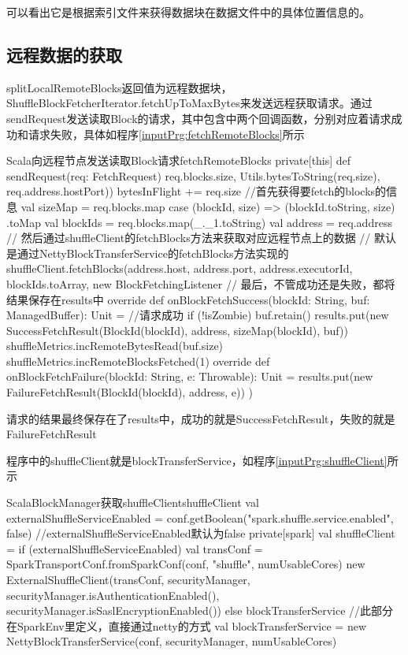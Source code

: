 可以看出它是根据索引文件来获得数据块在数据文件中的具体位置信息的。
\subsection{远程数据的获取}
splitLocalRemoteBlocks返回值为远程数据块，ShuffleBlockFetcherIterator.fetchUpToMaxBytes来发送远程获取请求。通过sendRequest发送读取Block的请求，其中包含中两个回调函数，分别对应着请求成功和请求失败，具体如程序\ref{inputPrg:fetchRemoteBlocks}所示
\begin{codeInput}{Scala}{向远程节点发送读取Block请求}{fetchRemoteBlocks}
private[this] def sendRequest(req: FetchRequest) {
  req.blocks.size, Utils.bytesToString(req.size), req.address.hostPort))
  bytesInFlight += req.size
  //首先获得要fetch的blocks的信息
  val sizeMap = req.blocks.map { case (blockId, size) => (blockId.toString, size) }.toMap
  val blockIds = req.blocks.map(_._1.toString)	
  val address = req.address
  // 然后通过shuffleClient的fetchBlocks方法来获取对应远程节点上的数据
  // 默认是通过NettyBlockTransferService的fetchBlocks方法实现的
  shuffleClient.fetchBlocks(address.host, address.port, address.executorId, blockIds.toArray,
    new BlockFetchingListener {
      // 最后，不管成功还是失败，都将结果保存在results中
      override def onBlockFetchSuccess(blockId: String, buf: ManagedBuffer): Unit = {//请求成功
        if (!isZombie) {
          buf.retain()
          results.put(new SuccessFetchResult(BlockId(blockId), address, sizeMap(blockId), buf))
          shuffleMetrics.incRemoteBytesRead(buf.size)
          shuffleMetrics.incRemoteBlocksFetched(1)
        }
      }	
      override def onBlockFetchFailure(blockId: String, e: Throwable): Unit = {
        results.put(new FailureFetchResult(BlockId(blockId), address, e))
      }
   })
}
\end{codeInput}

请求的结果最终保存在了results中，成功的就是SuccessFetchResult，失败的就是FailureFetchResult

程序中的shuffleClient就是blockTransferService，如程序\ref{inputPrg:shuffleClient}所示
\begin{codeInput}{Scala}{BlockManager获取shuffleClient}{shuffleClient}
val externalShuffleServiceEnabled = conf.getBoolean("spark.shuffle.service.enabled", false)
//externalShuffleServiceEnabled默认为false
private[spark] val shuffleClient = if (externalShuffleServiceEnabled) {
  val transConf = SparkTransportConf.fromSparkConf(conf, "shuffle", numUsableCores)
  new ExternalShuffleClient(transConf, securityManager, securityManager.isAuthenticationEnabled(),
  securityManager.isSaslEncryptionEnabled())
} else {
  blockTransferService
}
//此部分在SparkEnv里定义，直接通过netty的方式
val blockTransferService = new NettyBlockTransferService(conf, securityManager, numUsableCores)
\end{codeInput}
